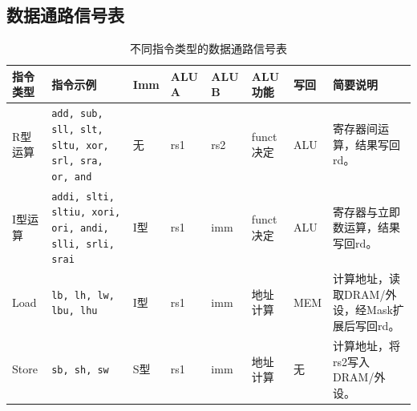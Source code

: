 \documentclass[12pt,a4paper]{ctexart}
\begin{document}
\subsection{数据通路信号表}

\begin{table}[H]
	\centering
	\caption{不同指令类型的数据通路信号表}
	\label{tab:datapath_signals}
	\scriptsize
	\setlength{\tabcolsep}{3pt}
	\renewcommand{\arraystretch}{1.15}
	\begin{tabularx}{\textwidth}{
		>{\centering\arraybackslash}p{1.35cm}
		>{\raggedright\arraybackslash}p{2.4cm}
		>{\centering\arraybackslash}p{0.9cm}
		>{\centering\arraybackslash}p{1.1cm}
		>{\centering\arraybackslash}p{1.1cm}
		>{\centering\arraybackslash}p{1.35cm}
		>{\centering\arraybackslash}p{1.2cm}
		X}
		\toprule
		指令类型                                                          & 指令示例 & Imm & ALU A   & ALU B & ALU功能 & 写回 & 简要说明 \\
		\midrule

		R型运算                                                          &
		\texttt{add, sub, sll, slt, sltu, xor, srl, sra, or, and}     &
		无                                                             & rs1  & rs2 & funct决定 & ALU   &
		寄存器间运算，结果写回rd。                                                                                                   \\

		I型运算                                                          &
		\texttt{addi, slti, sltiu, xori, ori, andi, slli, srli, srai} &
		I型                                                            & rs1  & imm & funct决定 & ALU   &
		寄存器与立即数运算，结果写回rd。                                                                                                \\

		Load                                                          &
		\texttt{lb, lh, lw, lbu, lhu}                                 &
		I型                                                            & rs1  & imm & 地址计算    & MEM   &
		计算地址，读取DRAM/外设，经Mask扩展后写回rd。                                                                                     \\

		Store                                                         &
		\texttt{sb, sh, sw}                                           &
		S型                                                            & rs1  & imm & 地址计算    & 无     &
		计算地址，将rs2写入DRAM/外设。                                                                                              \\


\end{tabularx}
\end{table}
\end{document}
